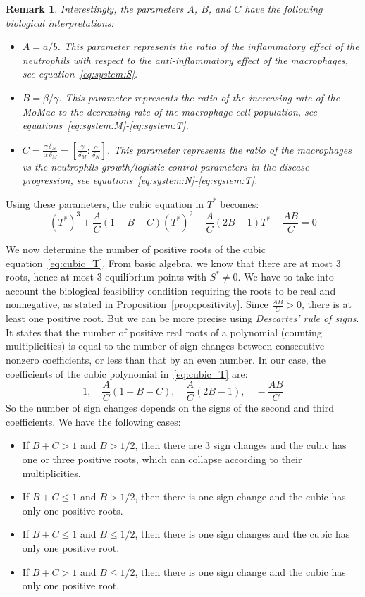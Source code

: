 \documentclass[a4paper, 12pt]{article}
\newtheorem{rem}{Remark}[section]
\begin{document}
\begin{rem}
Interestingly, the parameters $A$, $B$, and $C$ have the following biological interpretations:
\begin{itemize}
    \item $A = a/b$. This parameter represents the ratio of the inflammatory effect of the neutrophils with respect to the anti-inflammatory effect of the macrophages, see equation~\eqref{eq:system:S}.
    \item $B = \beta/\gamma$. This parameter represents the ratio of the increasing rate of the MoMac to the decreasing rate of the macrophage cell population, see equations~\eqref{eq:system:M}-\eqref{eq:system:T}.
    \item $C = \frac{\gamma \,\delta_N}{\alpha\,\delta_M} = \left[\frac{\gamma}{\delta_M} : \frac{\alpha}{\delta_N}\right]$. This parameter represents the ratio of the macrophages vs the neutrophils growth/logistic control parameters in the disease progression, see equations~\eqref{eq:system:N}-\eqref{eq:system:T}.
\end{itemize}   
\end{rem}
Using these parameters, the cubic equation in $T^*$ becomes:
\begin{equation} 
{\left(T^*\right)}^3 +  \frac{A}{C}  \left(1- B- C \right) {(T^*)}^2 + \frac{A}{C} \left(2 B -1 \right) T^* - \frac{A B}{C} = 0
\label{eq:cubic_T}
\end{equation}
\par\noindent We now determine the number of positive roots of the cubic equation~\eqref{eq:cubic_T}.
From basic algebra, we know that there are at most 3 roots, hence at most 3 equilibrium points with $S^* \neq 0$. 
We have to take into account the biological feasibility condition requiring the roots to be real and nonnegative, as stated in Proposition~\ref{prop:positivity}.
Since $\frac{AB}{C} > 0$,  there is at least one positive root. 
But we can be more precise using 
\emph{Descartes' rule of signs}. It states that the number of positive real roots of a polynomial (counting multiplicities) is equal to the number of sign changes between consecutive nonzero coefficients, or less than that by an even number. 
In our case, the coefficients of the cubic polynomial in~\eqref{eq:cubic_T} are:
\[1, \quad \frac{A}{C} \left(1- B- C \right), \quad \frac{A}{C} \left(2 B -1 \right), \quad - \frac{A B}{C}   \]  
So the number of sign changes depends on the signs of the second and third coefficients.
We have the following cases:
\begin{itemize}
\item If $ B +C > 1$ and $B > 1/2$, then there are 3 sign changes and the cubic has one or three positive roots, which can collapse according to their multiplicities.
\item If $B +C  \leq 1$ and $B > 1/2 $, then there is one sign change and the cubic has only one positive roots.
\item If $B +C  \leq  1$ and $B \leq 1/2$, then there is one sign changes and the cubic has only one positive root.
\item If $B +C  > 1$ and $B \leq 1/2$, then there is one sign change and the cubic has only one positive root.
\end{itemize}
\end{document}
